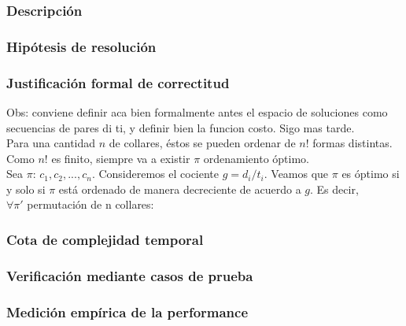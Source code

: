 \documentclass[11pt, a4paper, twoside]{article}
\begin{document}
{}

\subsubsection{Descripción}

\subsubsection{Hipótesis de resolución}

\subsubsection{Justificación formal de correctitud}
Obs: conviene definir aca bien formalmente antes el espacio de soluciones como secuencias de pares di ti, y definir bien la funcion costo. Sigo mas tarde.\\
	Para una cantidad $n$ de collares, \'estos se pueden ordenar de $n!$ formas distintas. Como $n!$ es finito, siempre va a existir $\pi$ ordenamiento \'optimo.
\\
	Sea $\pi$: $c_1, c_2, ... , c_n $. Consideremos el cociente $g = d_i / t_i $. Veamos que $\pi$ es \'optimo si y solo si $\pi$ est\'a ordenado de manera decreciente de acuerdo a $g$. Es decir,
	\\$ \forall \pi' $ permutaci\'on de n collares: 

\subsubsection{Cota de complejidad temporal}

\subsubsection{Verificación mediante casos de prueba}

\subsubsection{Medición empírica de la performance}

\end{document}
